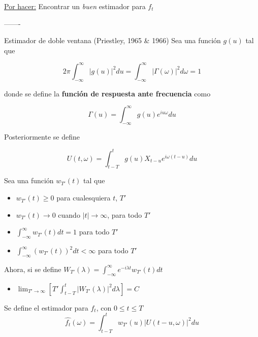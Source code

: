 \documentclass[12pt,a4paper]{mitthesis}
\begin{document}
\underline{Por hacer:} Encontrar un \textit{buen} estimador para $f_t$

-------

{Estimador de doble ventana (Priestley, 1965 \& 1966)}
Sea una funci\'on $g(u)$ tal que

\begin{equation*}
2\pi \int_{-\infty}^{\infty} \lvert g(u) \lvert^{2} du 
= 
\int_{-\infty}^{\infty} \lvert \Gamma(\omega) \lvert^{2} d\omega
= 1
\end{equation*}

donde se define la \textbf{funci\'on de respuesta ante frecuencia} como

\begin{equation*}
\Gamma(u) = \int_{-\infty}^{\infty} g(u) e^{i u \omega} du
\end{equation*}

Posteriormente se define 

\begin{equation*}
U(t,\omega) = \int_{t-T}^{t} g(u) X_{t-u} e^{i \omega (t-u)} du
\end{equation*}


Sea una funci\'on $w_{T'}(t)$ tal que
\begin{itemize}
\item $w_{T'}(t) \geq 0$ para cualesquiera $t$, $T'$
\item $w_{T'}(t) \rightarrow 0$ cuando $\lvert t \lvert \rightarrow \infty$, para todo $T'$
\item $\displaystyle \int_{-\infty}^{\infty} w_{T'}(t) dt = 1$ para todo $T'$
\item $\displaystyle \int_{-\infty}^{\infty} \left( w_{T'}(t) \right)^{2} dt < \infty$ para todo $T'$
\end{itemize}

Ahora, si se define 
$\displaystyle W_{T'}(\lambda) = \int_{-\infty}^{\infty} e^{-i\lambda t}w_{T'}(t) dt $
\begin{itemize}
\item $\lim_{T'\rightarrow\infty} \left[ T' \int_{t-T}^{t} \lvert W_{T'}(\lambda) \lvert^{2} d\lambda \right] = C$
\end{itemize}


\begin{tcolorbox}
Se define el estimador para $f_t$, con $0 \leq t \leq T$
\begin{equation*}
\widehat{f_t}(\omega) = \int_{t-T}^{t} w_{T'}(u) \lvert U(t-u,\omega) \lvert^{2} du
\end{equation*}
\end{tcolorbox}
\end{document}
